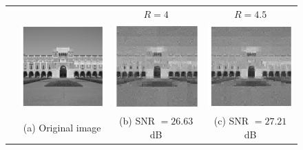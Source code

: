 \begin{figure}[t!]
	\begin{center}
		\setlength{\tabcolsep}{0pt}
		\renewcommand{\arraystretch}{0.5}
		\begin{tabular}{cccc}
			& & $R=4$ & $R=4.5$ \\
			\rotatebox{90}{$~~~~~~~m=4000$} &
			\includegraphics[width=0.32\linewidth]{./fig/lovett_original.pdf} &
			\includegraphics[width=0.32\linewidth]{./fig/lovett_r4_m_4000_s_800.pdf} & 
			\includegraphics[width=0.32\linewidth]{./fig/lovett_r450_m_4000_s_800.pdf}  \\
			& \small{(a) Original image}& \small{(b) SNR $=26.63$dB}& %
			\small{(c) SNR $=27.21$dB} \\
			

\end{tabular}
\end{center}
\end{figure}
